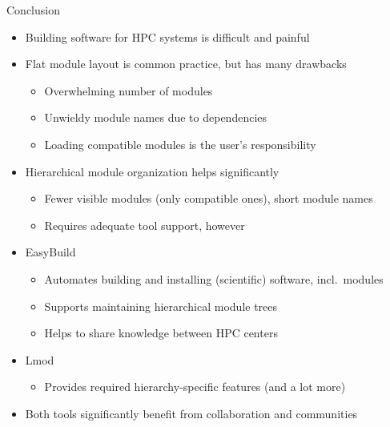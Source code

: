 \documentclass[10pt,xcolor={usenames,dvipsnames}]{beamer}
\begin{document}
\begin{frame}{Conclusion}
\begin{itemize}
    \item
        Building software for HPC systems is difficult and painful
    \item
        Flat module layout is common practice, but has many drawbacks
        \begin{itemize}
            \item
                Overwhelming number of modules
            \item
                Unwieldy module names due to dependencies
            \item
                Loading compatible modules is the user's responsibility
        \end{itemize}
    \item
        Hierarchical module organization helps significantly
        \begin{itemize}
            \item
                Fewer visible modules (only compatible ones), short module names
            \item
                Requires adequate tool support, however
        \end{itemize}
    \item
        EasyBuild
        \begin{itemize}
            \item
                Automates building and installing (scientific) software, incl.~modules
            \item
                Supports maintaining hierarchical module trees
            \item
                Helps to share knowledge between HPC centers
        \end{itemize}
    \item
        Lmod
        \begin{itemize}
            \item
                Provides required hierarchy-specific features (and a lot more)
        \end{itemize}
    \item
        Both tools significantly benefit from collaboration and
        communities
\end{itemize}
\end{frame}
\end{document}
